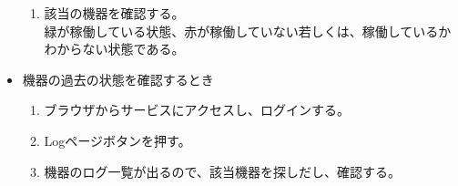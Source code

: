 \begin{itemize}
\begin{enumerate}
		\item 該当の機器を確認する。\\
			緑が稼働している状態、赤が稼働していない若しくは、稼働しているかわからない状態である。
	\end{enumerate}
\item 機器の過去の状態を確認するとき
	\begin{enumerate}
		\item ブラウザからサービスにアクセスし、ログインする。
		\item Logページボタンを押す。
		\item 機器のログ一覧が出るので、該当機器を探しだし、確認する。
	\end{enumerate}
\end{itemize}









